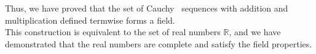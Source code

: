 \documentclass[preview]{standalone}
\begin{document}
\begin{center}
Thus, we have proved that the set of Cauchy \, sequences with addition and multiplication defined termwise forms a field. \\This construction is equivalent to the set of real numbers $\mathbb{R}$, and we have demonstrated that the real numbers are complete and satisfy the field properties.
\end{center}
\end{document}

